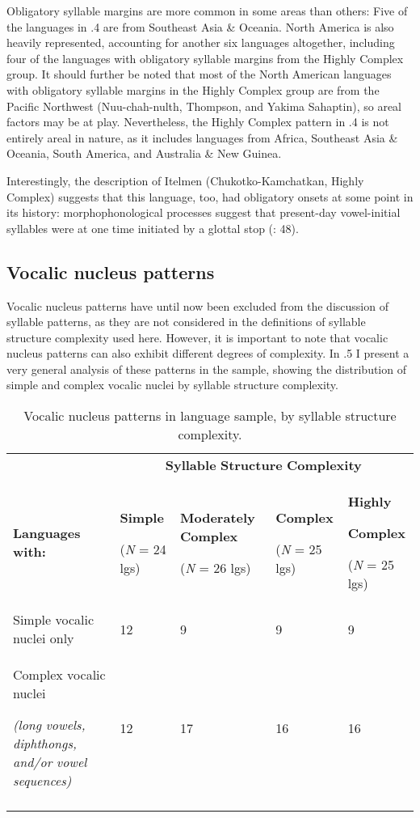   Obligatory syllable margins are more common in some areas than others: Five of the languages in .4 are from Southeast Asia \& Oceania. North America is also heavily represented, accounting for another six languages altogether, including four of the languages with obligatory syllable margins from the Highly Complex group. It should further be noted that most of the North American languages with obligatory syllable margins in the Highly Complex group are from the Pacific Northwest (Nuu-chah-nulth, Thompson, and Yakima Sahaptin), so areal factors may be at play. Nevertheless, the Highly Complex pattern in .4 is not entirely areal in nature, as it includes languages from Africa, Southeast Asia \& Oceania, South America, and Australia \& New Guinea. 

  Interestingly, the description of Itelmen (Chukotko-Kamchatkan, Highly Complex) suggests that this language, too, had obligatory onsets at some point in its history: morphophonological processes suggest that present-day vowel-initial syllables were at one time initiated by a glottal stop (\citealt{GeorgVolodin1999}: 48).

\subsection{Vocalic nucleus patterns}\label{sec:3.3.4}

  Vocalic nucleus patterns have until now been excluded from the discussion of syllable patterns, as they are not considered in the definitions of syllable structure complexity used here. However, it is important to note that vocalic nucleus patterns can also exhibit different degrees of complexity. In .5 I present a very general analysis of these patterns in the sample, showing the distribution of simple and complex vocalic nuclei by syllable structure complexity.

\begin{table}
\begin{tabularx}{\textwidth}{XXXXX}
 & \multicolumn{4}{c}{ \textbf{Syllable} \textbf{Structure} \textbf{Complexity}}\\
\lsptoprule
 \textbf{Languages} \textbf{with:} & { \textbf{Simple}}

 (\textit{N} = 24 lgs) & { \textbf{Moderately} \textbf{Complex}}

 (\textit{N} = 26 lgs) & { \textbf{Complex}}

 (\textit{N} = 25 lgs) & { \textbf{Highly} }

{ \textbf{Complex}}

 (\textit{N} = 25 lgs)\\
 Simple vocalic nuclei only & 12 & 9 & 9 & 9\\
{ Complex vocalic nuclei} 

 \textit{(long} \textit{vowels,} \textit{diphthongs,} \textit{and/or} \textit{vowel} \textit{sequences)} & 12 & 17 & 16 & 16\\
\lspbottomrule
\end{tabularx}
\caption{\label{3.5}Vocalic nucleus patterns in language sample, by syllable structure complexity.}
\end{table}

